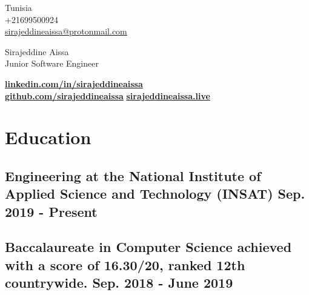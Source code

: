 \documentclass[a4,10pt]{article}
\begin{document}
\begin{center}
    \begin{minipage}[b]{0.24\textwidth}
            \large Tunisia \\
            \large +21699500924 \\
            \large \href{mailto:sirajeddineaissa@protonmail.com}{sirajeddineaissa@protonmail.com} 
    \end{minipage}%
    \begin{minipage}[b]{0.5\textwidth}
            \centering
            {\HUGE Sirajeddine Aissa} \\ %
            \vspace{0.1cm}
            {\color{UI_blue} \Large{Junior Software Engineer}} \\
    \end{minipage}%
    \begin{minipage}[b]{0.24\textwidth}
            \flushright \large  %
            {\href{https://www.linkedin.com/in/sirajeddineaissa}{\small \textbf {linkedin.com/in/sirajeddineaissa}} } \\
            \href{https://github.com/sirajeddineaissa}{\small \textbf {github.com/sirajeddineaissa}}
             \href{https://sirajeddineaissa.live}{\small \textbf {sirajeddineaissa.live}}
    \end{minipage}   
    
\vspace{-0.15cm} 
\end{center}


\section{Education }
\subsection*{Engineering {\normalsize \normalfont   at the National Institute of Applied Science and Technology (INSAT)} \hfill Sep. 2019 - Present} 
\vspace{0.1cm}
\subsection*{Baccalaureate in Computer Science {\normalsize \normalfont   achieved with a score of 16.30/20, ranked 12th countrywide. } \hfill Sep. 2018 - June 2019} 
\vspace{0.2cm}
\end{document}
